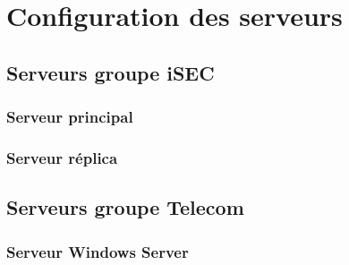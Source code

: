 \section{Configuration des serveurs}
	\subsection{Serveurs groupe iSEC}	
		\subsubsection{Serveur principal}
		\subsubsection{Serveur réplica}

	\subsection{Serveurs groupe Telecom}
		\subsubsection{Serveur Windows Server}